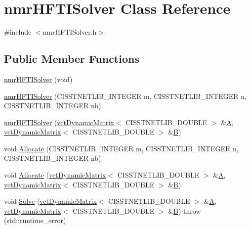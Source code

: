 \hypertarget{classnmr_h_f_t_i_solver}{\section{nmr\-H\-F\-T\-I\-Solver Class Reference}
\label{classnmr_h_f_t_i_solver}
}


{\ttfamily \#include $<$nmr\-H\-F\-T\-I\-Solver.\-h$>$}

\subsection*{Public Member Functions}
\begin{DoxyCompactItemize}
\item 
\hyperlink{classnmr_h_f_t_i_solver_acd47d95a501ba8a42cfd0e5fffffcc1c}{nmr\-H\-F\-T\-I\-Solver} (void)
\item 
\hyperlink{classnmr_h_f_t_i_solver_a1d1979ba72f47f23d3d2c565dd61105e}{nmr\-H\-F\-T\-I\-Solver} (C\-I\-S\-S\-T\-N\-E\-T\-L\-I\-B\-\_\-\-I\-N\-T\-E\-G\-E\-R m, C\-I\-S\-S\-T\-N\-E\-T\-L\-I\-B\-\_\-\-I\-N\-T\-E\-G\-E\-R n, C\-I\-S\-S\-T\-N\-E\-T\-L\-I\-B\-\_\-\-I\-N\-T\-E\-G\-E\-R nb)
\item 
\hyperlink{classnmr_h_f_t_i_solver_ae4642e2e44537e2c93f50510a573818a}{nmr\-H\-F\-T\-I\-Solver} (\hyperlink{classvct_dynamic_matrix}{vct\-Dynamic\-Matrix}$<$ C\-I\-S\-S\-T\-N\-E\-T\-L\-I\-B\-\_\-\-D\-O\-U\-B\-L\-E $>$ \&\hyperlink{classnmr_h_f_t_i_solver_a3bf7da50e30b56b35fa988819596c883}{A}, \hyperlink{classvct_dynamic_matrix}{vct\-Dynamic\-Matrix}$<$ C\-I\-S\-S\-T\-N\-E\-T\-L\-I\-B\-\_\-\-D\-O\-U\-B\-L\-E $>$ \&\hyperlink{classnmr_h_f_t_i_solver_a208b4bacf42c9d2b336f40a84f1f24b4}{B})
\item 
void \hyperlink{classnmr_h_f_t_i_solver_ac8d79d430a8c1927069bf777ea22d76b}{Allocate} (C\-I\-S\-S\-T\-N\-E\-T\-L\-I\-B\-\_\-\-I\-N\-T\-E\-G\-E\-R m, C\-I\-S\-S\-T\-N\-E\-T\-L\-I\-B\-\_\-\-I\-N\-T\-E\-G\-E\-R n, C\-I\-S\-S\-T\-N\-E\-T\-L\-I\-B\-\_\-\-I\-N\-T\-E\-G\-E\-R nb)
\item 
void \hyperlink{classnmr_h_f_t_i_solver_a3a6042bd4730932aae51c182c195ec16}{Allocate} (\hyperlink{classvct_dynamic_matrix}{vct\-Dynamic\-Matrix}$<$ C\-I\-S\-S\-T\-N\-E\-T\-L\-I\-B\-\_\-\-D\-O\-U\-B\-L\-E $>$ \&\hyperlink{classnmr_h_f_t_i_solver_a3bf7da50e30b56b35fa988819596c883}{A}, \hyperlink{classvct_dynamic_matrix}{vct\-Dynamic\-Matrix}$<$ C\-I\-S\-S\-T\-N\-E\-T\-L\-I\-B\-\_\-\-D\-O\-U\-B\-L\-E $>$ \&\hyperlink{classnmr_h_f_t_i_solver_a208b4bacf42c9d2b336f40a84f1f24b4}{B})
\item 
void \hyperlink{classnmr_h_f_t_i_solver_a8c93b7bdf19fc68959a774cae5504d28}{Solve} (\hyperlink{classvct_dynamic_matrix}{vct\-Dynamic\-Matrix}$<$ C\-I\-S\-S\-T\-N\-E\-T\-L\-I\-B\-\_\-\-D\-O\-U\-B\-L\-E $>$ \&\hyperlink{classnmr_h_f_t_i_solver_a3bf7da50e30b56b35fa988819596c883}{A}, \hyperlink{classvct_dynamic_matrix}{vct\-Dynamic\-Matrix}$<$ C\-I\-S\-S\-T\-N\-E\-T\-L\-I\-B\-\_\-\-D\-O\-U\-B\-L\-E $>$ \&\hyperlink{classnmr_h_f_t_i_solver_a208b4bacf42c9d2b336f40a84f1f24b4}{B})  throw (std\-::runtime\-\_\-error)
\end{DoxyCompactItemize}
